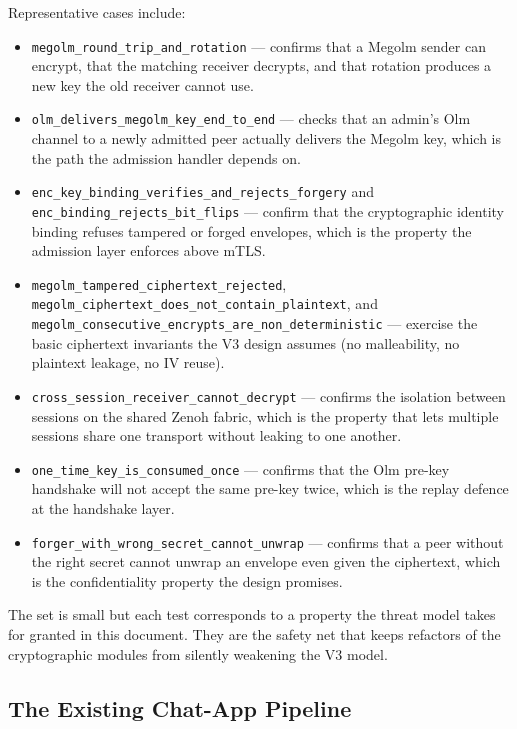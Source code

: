 \documentclass[11pt,a4paper]{article}
\begin{document}
Representative cases include:

\begin{itemize}
  \item \texttt{megolm\_round\_trip\_and\_rotation} — confirms
        that a Megolm sender can encrypt, that the matching
        receiver decrypts, and that rotation produces a new key
        the old receiver cannot use.
  \item \texttt{olm\_delivers\_megolm\_key\_end\_to\_end} — checks
        that an admin's Olm channel to a newly admitted peer
        actually delivers the Megolm key, which is the path the
        admission handler depends on.
  \item \texttt{enc\_key\_binding\_verifies\_and\_rejects\_forgery}
        and \texttt{enc\_binding\_rejects\_bit\_flips} — confirm
        that the cryptographic identity binding refuses tampered
        or forged envelopes, which is the property the admission
        layer enforces above mTLS.
  \item \texttt{megolm\_tampered\_ciphertext\_rejected},
        \texttt{megolm\_ciphertext\_does\_not\_contain\_plaintext},
        and
        \texttt{megolm\_consecutive\_encrypts\_are\_non\_deterministic}
        — exercise the basic ciphertext invariants the V3
        design assumes (no malleability, no plaintext leakage,
        no IV reuse).
  \item \texttt{cross\_session\_receiver\_cannot\_decrypt} —
        confirms the isolation between sessions on the shared
        Zenoh fabric, which is the property that lets multiple
        sessions share one transport without leaking to one
        another.
  \item \texttt{one\_time\_key\_is\_consumed\_once} — confirms
        that the Olm pre-key handshake will not accept the same
        pre-key twice, which is the replay defence at the
        handshake layer.
  \item \texttt{forger\_with\_wrong\_secret\_cannot\_unwrap} —
        confirms that a peer without the right secret cannot
        unwrap an envelope even given the ciphertext, which is
        the confidentiality property the design promises.
\end{itemize}

The set is small but each test corresponds to a property the
threat model takes for granted in this document. They are the
safety net that keeps refactors of the cryptographic modules
from silently weakening the V3 model.

\subsection{The Existing Chat-App Pipeline}
\end{document}
